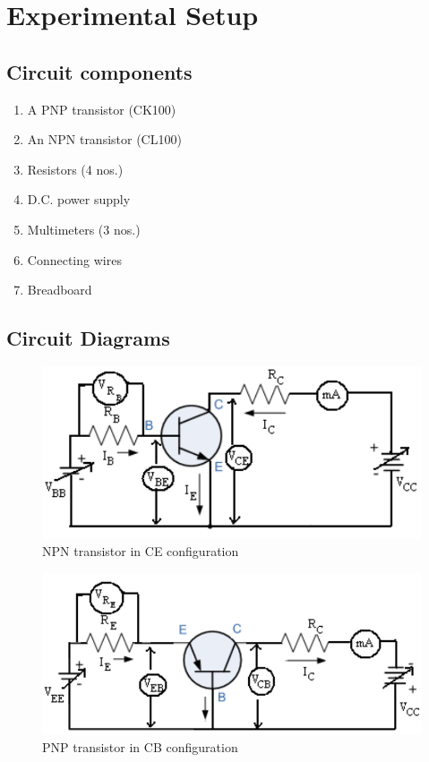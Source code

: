 \section{Experimental Setup}

\subsection*{Circuit components}
    \begin{enumerate}
        \item A PNP transistor (CK100) 
        \item An NPN transistor (CL100)
        \item Resistors (4 nos.)
        \item D.C. power supply
        \item Multimeters (3 nos.)
        \item Connecting wires
        \item Breadboard
    \end{enumerate}

    \subsection*{Circuit Diagrams}
    \begin{figure}[H]
        \centering
        \includegraphics[width=.9\columnwidth]{images/ce.png}
        \caption{NPN transistor in CE configuration}
        \label{fig:1}
    \end{figure}

    \begin{figure}[H]
        \centering
        \includegraphics[width=.9\columnwidth]{images/cb.png}
        \caption{PNP transistor in CB configuration}
        \label{fig:2}
    \end{figure}

